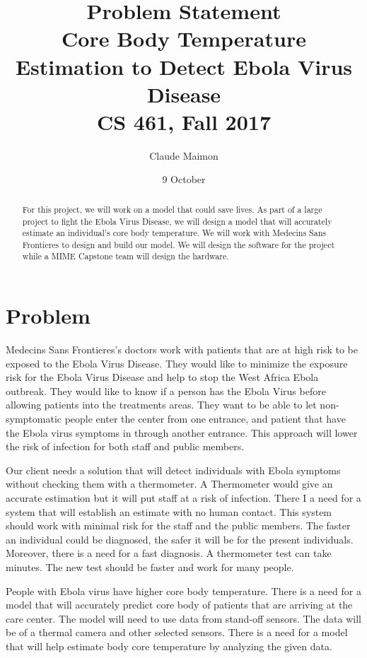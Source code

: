 \documentclass{article}
\title{%
  Problem Statement \\
  \large Core Body Temperature Estimation to Detect Ebola Virus Disease \\
  \large CS 461, Fall 2017\\
    }
\author{Claude Maimon }
\date{9 October}
\begin{document}
\maketitle


\begin{abstract}
For this project, we will work on a model that could save lives. As part of a large project to fight the Ebola Virus Disease, we will design a model that will accurately estimate an individual’s core body temperature. We will work with Medecins Sans Frontieres to design and build our model. We will design the software for the project while a MIME Capstone team will design the hardware.  \end{abstract}
\newpage
\section{Problem}
Medecins Sans Frontieres’s doctors work with patients that are at high risk to be exposed to the Ebola Virus Disease. They would like to minimize the exposure risk for the Ebola Virus Disease and help to stop the West Africa Ebola outbreak. They would like to know if a person has the Ebola Virus before allowing patients into the treatments areas. They want to be able to let non-symptomatic people enter the center from one entrance, and patient that have the Ebola virus symptoms in through another entrance. This approach will lower the risk of infection for both staff and public members.\par 
Our client needs a solution that will detect individuals with Ebola symptoms without checking them with a thermometer. A Thermometer would give an accurate estimation but it will put staff at a risk of infection. There I a need for a system that will establish an estimate with no human contact. This system should work with minimal risk for the staff and the public members. The faster an individual could be diagnosed, the safer it will be for the present individuals. Moreover, there is a need for a fast diagnosis. A thermometer test can take minutes. The new test should be faster and work for many people. \par
People with Ebola virus have higher core body temperature. There is a need for a model that will accurately predict core body of patients that are arriving at the care center. The model will need to use data from stand-off sensors. The data will be of a thermal camera and other selected sensors. There is a need for a model that will help estimate body core temperature by analyzing the given data.   
\end{document}
